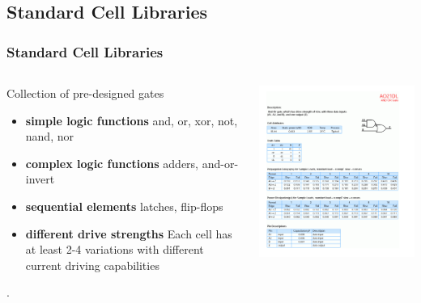 \documentclass[compress]{beamer}
\begin{document}
\subsection[Cell]{Standard Cell Libraries}
\begin{frame}
	\frametitle{Standard Cell Libraries}
	\begin{columns}
		\begin{block}{Collection of pre-designed gates}
			\begin{itemize}
				\item \textbf {simple logic functions} \newline
				and, or, xor, not, nand, nor
				\item \textbf {complex logic functions} \newline
				adders, and-or-invert
				\item \textbf {sequential elements} \newline
				latches, flip-flops
				\item \textbf {different drive strengths} \newline
				Each cell has at least 2-4
				variations with different
				current driving capabilities	
			\end{itemize}.
		\end{block}
		\begin{center}
			\includegraphics[width=\textwidth]{cells}
		\end{center}
	\end{columns}
\end{frame}
\end{document}
